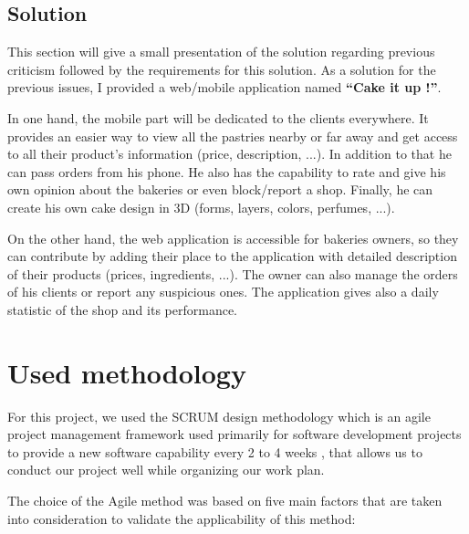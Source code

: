 \documentclass[12pt,a4paper]{report}
\begin{document}
	\subsection{Solution}
	This section will give a small presentation of the solution regarding previous criticism followed by the requirements for this solution.
	As a solution for the previous issues, I provided a web/mobile application named \textbf{``Cake it up !''}.\par
	In one hand, the mobile part will be dedicated to the clients everywhere. It provides an easier way to view all the pastries nearby or far away and get access to all their product's information (price, description, ...). In addition to that he can pass orders from his phone. He also has the capability to rate and give his own opinion about the bakeries or even block/report a shop. Finally, he can create his own cake design in 3D (forms, layers, colors, perfumes, ...). \par
	On the other hand, the web application is accessible for bakeries owners, so they can contribute by adding their place to the application with detailed description of their products (prices, ingredients, ...). The owner can also manage the orders of his clients or report any suspicious ones. The application gives also a daily statistic of the shop and its performance.
	
	
	\section{Used methodology}
	
	For this project, we used the SCRUM design methodology which is an agile project management framework used primarily for software development projects to provide a new software capability every 2 to 4 weeks , that allows us to conduct our project well while organizing our work plan.\par 
	The choice of the Agile method was based on five main factors that are taken into consideration to validate the applicability of this method:\par
	
\end{document}
